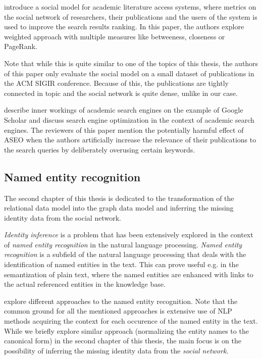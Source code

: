 \cite{social-model-literature-access} introduce a social model for academic literature access systems, 
where metrics on the social network of researchers, their publications and the users of the system is used to improve 
the search results ranking. In this paper, the authors explore weighted approach with multiple measures like betweeness, closeness or PageRank.

Note that while this is quite similar to one of the topics of this thesis, the authors of this paper
only evaluate the social model on a small dataset of publications in the \ac{ACM} \ac{SIGIR} conference.
Because of this, the publications are tightly connected in topic and the social network is quite dense, unlike in our case.

\cite{aseo} describe inner workings of academic search engines on the example of Google Scholar and
discuss search engine optimization in the context of academic search engines. 
The reviewers of this paper mention the potentially harmful effect of \ac{ASEO} when the authors artificially increase 
the relevance of their publications to the search queries by deliberately overusing certain keywords.

\subsection*{Named entity recognition}

The second chapter of this thesis is dedicated to the transformation of the relational data model into the graph data model
and inferring the missing identity data from the social network.

\textit{Identity inference} is a problem that has been extensively explored in the context of \textit{named entity recognition} in the natural language processing.
\textit{Named entity recognition} is a subfield of the natural language processing that deals with the identification of named entities in the text.
This can prove useful e.g. in the semantization of plain text, where the named entities are enhanced with links to the actual referenced entities in the knowledge base.

\cite{ner-approaches} explore different approaches to the named entity recognition.
Note that the common ground for all the mentioned approaches is extensive use of \ac{NLP} methods acquiring the context for each occurence of the named entity in the text.
While we briefly explore similar approach (normalizing the entity names to the canonical form) in the second chapter of this thesis,
the main focus is on the possibility of inferring the missing identity data from the \textit{social network}. 

